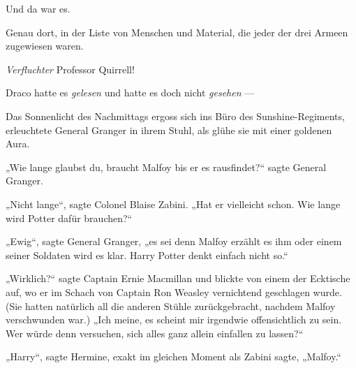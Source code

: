 Und da war es.

Genau dort, in der Liste von Menschen und Material, die jeder der drei Armeen zugewiesen waren.

\emph{Verfluchter} Professor Quirrell!

Draco hatte es \emph{gelesen} und hatte es doch nicht \emph{gesehen} —

\later

Das Sonnenlicht des Nachmittags ergoss sich ins Büro des Sunshine-Regiments, erleuchtete General Granger in ihrem Stuhl, als glühe sie mit einer goldenen Aura.

„Wie lange glaubst du, braucht Malfoy bis er es rausfindet?“ sagte General Granger.

„Nicht lange“, sagte Colonel Blaise Zabini.
„Hat er vielleicht schon. Wie lange wird Potter dafür brauchen?“

„Ewig“, sagte General Granger, „es sei denn Malfoy erzählt es ihm oder einem seiner Soldaten wird es klar. Harry Potter denkt einfach nicht so.“

„Wirklich?“ sagte Captain Ernie Macmillan und blickte von einem der Ecktische auf, wo er im Schach von Captain Ron Weasley vernichtend geschlagen wurde. (Sie hatten natürlich all die anderen Stühle zurückgebracht, nachdem Malfoy verschwunden war.)
„Ich meine, es scheint mir irgendwie offensichtlich zu sein. Wer würde denn versuchen, sich alles ganz allein einfallen zu lassen?“

„Harry“, sagte Hermine, exakt im gleichen Moment als Zabini sagte,
„Malfoy.“

